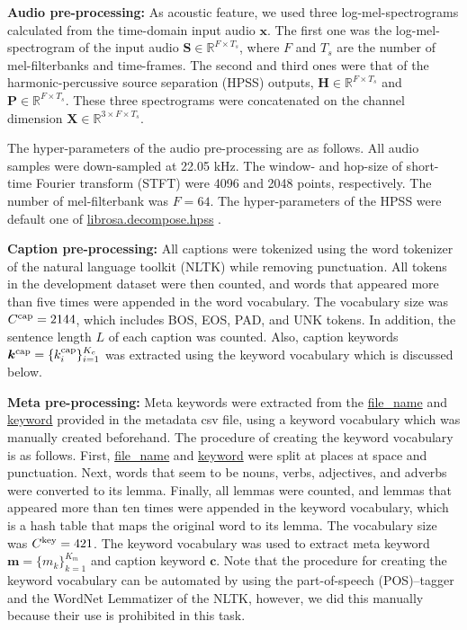 \documentclass{article}
\begin{document}
\begin{sloppy}
{\bf Audio pre-processing:}
As acoustic feature, we used three log-mel-spectrograms calculated from the time-domain input audio $\bm{x}$.
The first one was the log-mel-spectrogram of the input audio $\bm{S} \in \mathbb{R}^{F \times T_s}$,
where $F$ and $T_s$ are the number of mel-filterbanks and time-frames.
The second and third ones were that of the harmonic-percussive source separation (HPSS) outputs, $\bm{H} \in \mathbb{R}^{F \times T_s}$ and $\bm{P} \in \mathbb{R}^{F \times T_s}$.
These three spectrograms were concatenated on the channel dimension $\bm{X} \in \mathbb{R}^{3 \times F \times T_s}$.

The hyper-parameters of the audio pre-processing are as follows.
All audio samples were down-sampled at 22.05 kHz.
The window- and hop-size of short-time Fourier transform (STFT) were 4096 and 2048 points, respectively.
The number of mel-filterbank was $F=64$.
The hyper-parameters of the HPSS were default one of \url{librosa.decompose.hpss} \cite{hpss}.

\vspace{3pt}
\noindent
{\bf Caption pre-processing:}
All captions were tokenized using the word tokenizer of the natural language toolkit (NLTK) \cite{nltk} while removing punctuation. All tokens in the development dataset were then counted, and words that appeared more than five times were appended in the word vocabulary. The vocabulary size was $C^{\mbox{\scriptsize cap}} = 2144$, which includes BOS, EOS, PAD, and UNK tokens.
In addition, the sentence length $L$ of each caption was counted.
Also, caption keywords $\bm{k}^{\mbox{\scriptsize cap}} = \{ k_i^{\mbox{\scriptsize cap}} \}_{i=1}^{K_c}$ was extracted using the keyword vocabulary which is discussed below.

\vspace{3pt}
\noindent
{\bf Meta pre-processing:} 
Meta keywords were extracted from the \url{file_name} and \url{keyword} provided in the metadata csv file, using a keyword vocabulary which was manually created beforehand.
The procedure of creating the keyword vocabulary is as follows. First, \url{file_name} and \url{keyword} were split at places at space and punctuation. Next, words that seem to be nouns, verbs, adjectives, and adverbs were converted to its lemma. Finally, all lemmas were counted, and lemmas that appeared more than ten times were appended in the keyword vocabulary, which is a hash table that maps the original word to its lemma.
The vocabulary size was $C^{\mbox{\scriptsize key}} = 421$.
The keyword vocabulary was used to extract meta keyword $\bm{m} = \{ m_k \}_{k=1}^{K_m}$ and caption keyword $\bm{c}$.
Note that the procedure for creating the keyword vocabulary can be automated by using the part-of-speech (POS)--tagger and the WordNet Lemmatizer of the NLTK, however, we did this manually because their use is prohibited in this task.





\end{sloppy}
\end{document}
